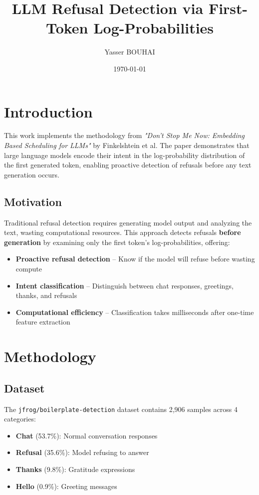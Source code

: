 \documentclass[11pt]{article}
\title{\textbf{LLM Refusal Detection via First-Token Log-Probabilities}}
\author{Yasser BOUHAI}
\date{\today}
\begin{document}
\maketitle

\section{Introduction}

This work implements the methodology from \textit{"Don't Stop Me Now: Embedding Based Scheduling for LLMs"} \cite{finkelshtein2025dontstop} by Finkelshtein et al. The paper demonstrates that large language models encode their intent in the log-probability distribution of the first generated token, enabling proactive detection of refusals before any text generation occurs.

\subsection{Motivation}

Traditional refusal detection requires generating model output and analyzing the text, wasting computational resources. This approach detects refusals \textbf{before generation} by examining only the first token's log-probabilities, offering:

\begin{itemize}
    \item \textbf{Proactive refusal detection} -- Know if the model will refuse before wasting compute
    \item \textbf{Intent classification} -- Distinguish between chat responses, greetings, thanks, and refusals
    \item \textbf{Computational efficiency} -- Classification takes milliseconds after one-time feature extraction
\end{itemize}

\section{Methodology}

\subsection{Dataset}

The \texttt{jfrog/boilerplate-detection} dataset contains 2,906 samples across 4 categories:
\begin{itemize}
    \item \textbf{Chat} (53.7\%): Normal conversation responses
    \item \textbf{Refusal} (35.6\%): Model refusing to answer
    \item \textbf{Thanks} (9.8\%): Gratitude expressions
    \item \textbf{Hello} (0.9\%): Greeting messages
\end{itemize}
\end{document}
